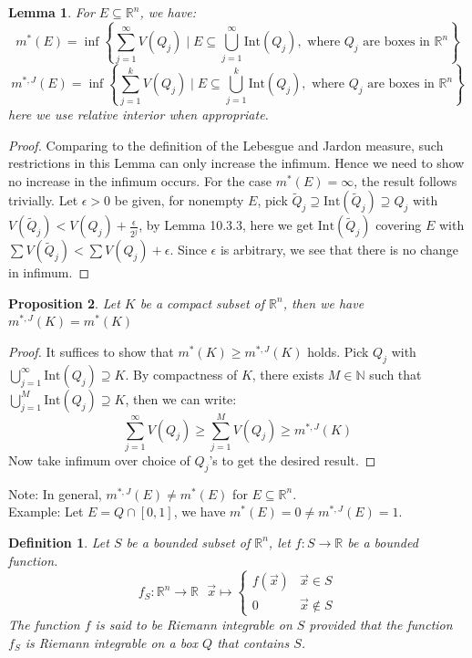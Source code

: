 \documentclass[11pt,oneside]{book}
\theoremstyle{break}
\theoremstyle{break}
\newtheorem{lem}{Lemma}[thm]
\newtheorem{prop}[lem]{Proposition}
\newtheorem{defn}{Definition}[corL]
\newcommand{\R}{\mathbb{R}}
\newcommand{\N}{\mathbb{N}}
\newcommand{\Int}{\text{Int}}
\newcommand{\note}{\color{red}Note: \color{black}}
\newcommand{\example}{\color{green}Example: \color{black}}
\begin{document}
\begin{lem}
For $E \subseteq \R^n$, we have: 
$$m^*(E) = \inf\left\{\sum_{j=1}^\infty V(Q_j) \mid E \subseteq \bigcup_{j=1}^\infty \text{Int}(Q_j) , \text{ where } Q_j \text{ are boxes in }\R^n \right\}$$
$$m^{*,J}(E) = \inf\left\{\sum_{j=1}^k V(Q_j) \mid E \subseteq \bigcup_{j=1}^k \text{Int}(Q_j ), \text{ where } Q_j \text{ are boxes in }\R^n\right\} $$
here we use relative interior when appropriate. 
\end{lem}
\begin{proof}
Comparing to the definition of the Lebesgue and Jardon measure, such restrictions in this Lemma can only increase the infimum. Hence we need to show no increase in the infimum occurs. For the case $m^*(E) = \infty$, the result follows trivially. Let $\epsilon>0$ be given, for nonempty $E$, pick $\widetilde{Q}_j \supseteq \text{Int}(\widetilde{Q}_j) \supseteq Q_j$ with $V(\widetilde{Q}_j) < V(Q_j) + \frac{\epsilon}{2^j}$, by Lemma 10.3.3, here we get $\text{Int}(\widetilde{Q}_j)$ covering $E$ with $\sum V(\widetilde{Q}_j) < \sum V(Q_j) + \epsilon$. Since $\epsilon$ is arbitrary, we see that there is no change in infimum. 
\end{proof}
\newpage

\begin{prop}
Let $K$ be a compact subset of $\R^n$, then we have $m^{*,J}(K) = m^*(K)$
\end{prop}
\begin{proof}
It suffices to show that $m^*(K) \geq m^{*,J}(K)$ holds. Pick $Q_j$ with $\bigcup_{j=1}^\infty \text{Int}(Q_j) \supseteq K$. By compactness of $K$, there exists $M \in \N$ such that $\bigcup_{j=1}^M \Int(Q_j) \supseteq K$, then we can write:
$$\sum_{j=1}^\infty V(Q_j) \geq \sum_{j=1}^M V(Q_j) \geq m^{*,J}(K)$$
Now take infimum over choice of $Q_j$'s to get the desired result.
\end{proof}


\note In general, $m^{*,J}(E) \neq m^{*} (E)$ for $E \subseteq \R^n$.\\
\example Let $E = Q \cap [0,1]$, we have $m^*(E) = 0 \neq m^{*,J}(E) = 1$. 



\begin{defn}
Let $S$ be a bounded subset of $\R^n$, let $f:S \to \R$ be a bounded function. $$f_S: \R^n \to \R \ \ \ \vec{x}\mapsto\begin{cases} f(\vec{x}) & \vec{x}\in S \\ 0 & \vec{x}\notin S\end{cases}$$ 
The function $f$ is said to be Riemann integrable on $S$ provided that the function $f_S$ is Riemann integrable on a box $Q$ that contains $S$. 
\end{defn}
\end{document}
